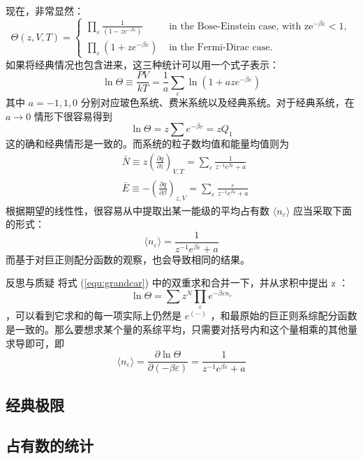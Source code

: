 现在，非常显然：
\begin{equation}
    \Theta(z, V, T)= \begin{cases}\displaystyle \prod_{\varepsilon} \frac{1}{\left(1-z e^{-\beta \varepsilon}\right)} & \text { in the Bose-Einstein case, with } \mathrm{ze}^{-\beta \varepsilon}<1, \\ \displaystyle\prod_{\varepsilon}\left(1+z e^{-\beta \varepsilon}\right) & \text { in the Fermi-Dirac case. }\end{cases}
\end{equation}
如果将经典情况也包含进来，这三种统计可以用一个式子表示：
\begin{equation}
    \ln\Theta \equiv \frac{P V}{k T}=\frac{1}{a} \sum_{\varepsilon} \ln \left(1+a z e^{-\beta \varepsilon}\right)
\end{equation}
其中 $a = -1,1,0$ 分别对应玻色系统、费米系统以及经典系统。对于经典系统，在 $a\rightarrow 0$ 情形下很容易得到
\[
    \ln\Theta = z \sum e^{-\beta\varepsilon} = zQ_1
\]
这的确和经典情形是一致的。而系统的粒子数均值和能量均值则为
\begin{equation}
    \begin{aligned}
    &\bar{N} \equiv z\left(\frac{\partial q}{\partial z}\right)_{V, T}=\sum_{\varepsilon} \frac{1}{z^{-1} e^{\beta \varepsilon}+a}\\
    &\bar{E} \equiv-\left(\frac{\partial q}{\partial \beta}\right)_{z, V}=\sum_{\varepsilon} \frac{\varepsilon}{z^{-1} e^{\beta \varepsilon}+a}
    \end{aligned}
\end{equation}
根据期望的线性性，很容易从中提取出某一能级的平均占有数 $\langle n_\varepsilon\rangle$ 应当采取下面的形式：
\begin{equation}\label{equ:zhanjushu}
    \langle n_\varepsilon\rangle = \frac{1}{z^{-1} e^{\beta \varepsilon}+a}
\end{equation}
而基于对巨正则配分函数的观察，也会导致相同的结果。

\begin{justification}{\kaishu 反思与质疑}
\kaishu \fontsize{11pt}{16pt}
\quad\quad 将式 (\ref*{equ:grandcar}) 中的双重求和合并一下，并从求积中提出 z ：
\[
    \ln\Theta =\sum z^N\prod_{\varepsilon}e^{-\beta \varepsilon n_{\varepsilon}}
\]
，可以看到它求和的每一项实际上仍然是 $e^{(\cdots)}$ ，和最原始的巨正则系综配分函数是一致的。那么要想求某个量的系综平均，只需要对括号内和这个量相乘的其他量求导即可，即
\[
    \langle n_\varepsilon\rangle =\frac{\partial \ln\Theta}{\partial( -\beta \varepsilon)} = \frac{1}{z^{-1} e^{\beta \varepsilon}+a}
\]
\end{justification}

\subsection{经典极限}

\subsection{占有数的统计}